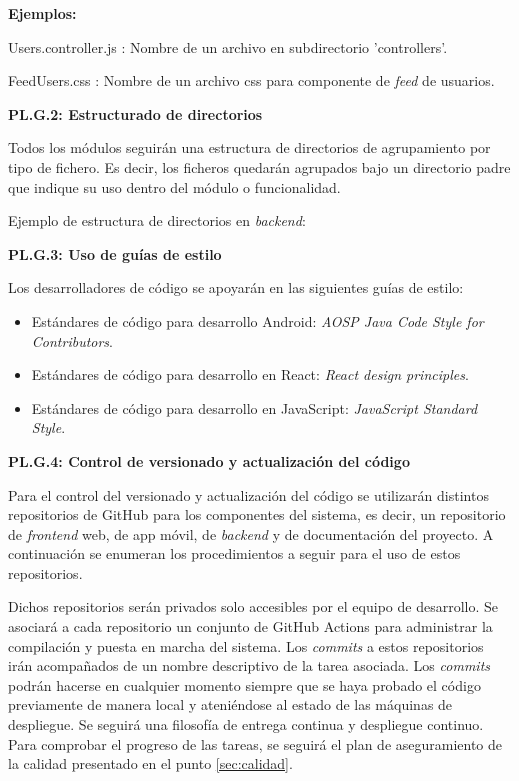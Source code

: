 \documentclass{article}
\begin{document}
\textbf{Ejemplos:} 

Users.controller.js : Nombre de un archivo en subdirectorio 'controllers'.

FeedUsers.css :  Nombre de un archivo css para componente de \textit{feed} de usuarios.

\pagebreak
\textbf{PL.G.2: Estructurado de directorios}

Todos los módulos seguirán una estructura de directorios de agrupamiento por tipo de fichero. Es decir, los ficheros quedarán agrupados bajo un directorio padre que indique su uso dentro del módulo o funcionalidad.

Ejemplo de estructura de directorios en \textit{backend}:


\textbf{PL.G.3: Uso de guías de estilo}

Los desarrolladores de código se apoyarán en las siguientes guías de estilo:

\begin{itemize}
    \setlength{\itemsep}{0em}
    \item Estándares de código para desarrollo Android: \textit{AOSP Java Code Style for Contributors}.
    \item Estándares de código para desarrollo en React: \textit{React design principles}.
    \item Estándares de código para desarrollo en JavaScript: \textit{JavaScript Standard Style}.
\end{itemize}

\textbf{PL.G.4: Control de versionado y actualización del código}

Para el control del versionado y actualización del código se utilizarán distintos repositorios de GitHub para los componentes del sistema, es decir, un repositorio de \textit{frontend} web, de app móvil, de \textit{backend} y de documentación del proyecto. A continuación se enumeran los procedimientos a seguir para el uso de estos repositorios.

Dichos repositorios serán privados solo accesibles por el equipo de desarrollo. Se asociará a cada repositorio un conjunto de GitHub Actions para administrar la compilación y puesta en marcha del sistema. Los \textit{commits} a estos repositorios irán acompañados de un nombre descriptivo de la tarea asociada. Los \textit{commits} podrán hacerse en cualquier momento siempre que se haya probado el código previamente de manera local y ateniéndose al estado de las máquinas de despliegue. Se seguirá una filosofía de entrega continua y despliegue continuo. Para comprobar el progreso de las tareas, se seguirá el plan de aseguramiento de la calidad presentado en el punto \ref{sec:calidad}.
\end{document}
